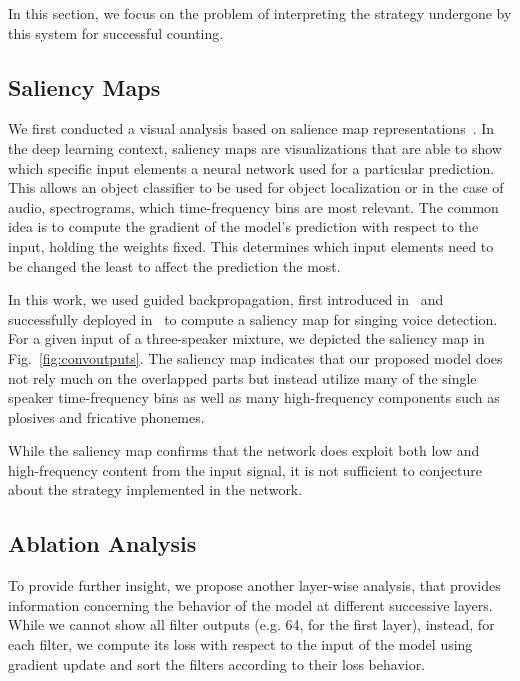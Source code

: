 In this section, we focus on the problem of interpreting the strategy undergone by this system for successful counting.

\subsection{Saliency Maps}
We first conducted a visual analysis based on salience map representations~\cite{simonyan13}.
In the deep learning context, saliency maps are visualizations that are able to show which specific input elements a neural network used for a particular prediction. This allows an object classifier to be used for object localization or in the case of audio, spectrograms, which time-frequency bins are most relevant.
The common idea is to compute the gradient of the model's prediction with respect to the input, holding the weights fixed. This determines which input elements need to be changed the least to affect the prediction the most.
\par
In this work, we used guided backpropagation, first introduced in~\cite{Springenberg14} and successfully deployed in~\cite{schluter16} to compute a saliency map for singing voice detection.
For a given input of a three-speaker mixture, we depicted the saliency map in Fig.~\ref{fig:convoutputs}.
The saliency map indicates that our proposed model does not rely much on the overlapped parts but instead utilize many of the single speaker time-frequency bins as well as many high-frequency components such as plosives and fricative phonemes.\par
While the saliency map confirms that the network does exploit both low and high-frequency content from the input signal, it is not sufficient to conjecture about the strategy implemented in the network.

\subsection{Ablation Analysis}
To provide further insight, we propose another layer-wise analysis, that provides information concerning the behavior of the model at different successive layers.
While we cannot show all filter outputs (e.g. 64, for the first layer), instead, for each filter, we compute its loss with respect to the input of the model using gradient update and sort the filters according to their loss behavior.\par

